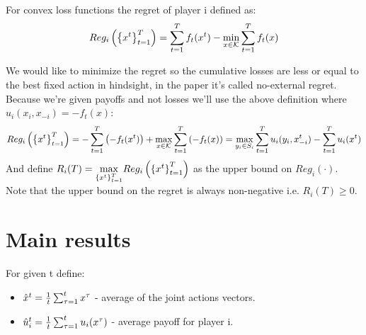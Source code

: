 \documentclass[11pt]{article}
\theoremstyle{definition}
\theoremstyle{definition}
\begin{document}
For convex loss functions the regret of player i defined as:\\
$$Reg_i \left( \left\{ x^t \right\}_{t=1}^{T} \right) = \sum_{t=1}^T f_t(x^t) - \underset{x \in \mathcal{K}}{\min} \sum_{t=1}^T f_t(x)$$

We would like to minimize the regret so the cumulative losses are less or equal to the best fixed action in hindsight, in the paper it's called no-external regret.\\
Because we're given payoffs and not losses we'll use the above definition where $u_i(x_i,x_{-i}) = -f_t(x)$:
$$Reg_i \left( \left\{ x^t \right\}_{t=1}^{T} \right) = -\sum_{t=1}^T \left( -f_t(x^t) \right) + \underset{x \in \mathcal{K}}{\max} \sum_{t=1}^T \left( -f_t(x) \right) = \underset{y_i \in S_i}{\max} \sum_{t=1}^T u_i(y_i, x_{-i}^t) - \sum_{t=1}^T u_i (x^t)$$
And define $R_i(T) = \underset{\left\{ x^t \right\}_{t=1}^{T}}{\max} Reg_i \left( \left\{ x^t \right\}_{t=1}^{T} \right)$ as the upper bound on $Reg_i(\cdot)$.\\
Note that the upper bound on the regret is always non-negative i.e. $R_i(T) \geq 0$.




\newcommand{\xh}[1]{\hat x^{#1}}
\newcommand{\uh}[1]{\hat u^{#1}}
\newcommand{\up}[3]{u_{#1} \pr{#2,#3}}
\newcommand{\upi}[2]{u_i (#1,#2)}
\newcommand{\upj}[2]{u_j (#1,#2)}

\def\bri{BR_i\pr{\xh{t}_{-i}}}
\def\brj{BR_j\pr{\xh{t}_{-j}}}
\def\ot{\fracc{t}}
\def\rit{R_i(t)}
\def\rjt{R_j(t)}
\def\si{\sum_{i=1}^n}
\def\sj{\sum_{j=1}^n}
\def\sta{\sum_{\tau=1}^t}

\section{Main results}
For given t define:
\begin{itemize}
	\item
		$\xh{t} = \fracc{t} \sum_{\tau = 1}^t x^\tau$ - average of the joint actions vectors.
	\item
		$\uh{t}_i = \ot \sta u_i(x^\tau)$ - average payoff for player i.
\end{itemize}
\end{document}
